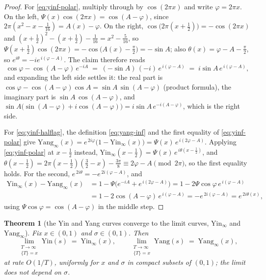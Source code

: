 \documentclass[11pt]{article}
\newtheorem{theorem}{Theorem}[section]
\theoremstyle{definition}
\begin{document}
\begin{proof}
For \eqref{eq:yinf-polar}, multiply through by $\cos(2\pi x)$ and write
$\varphi=2\pi x$. On the left, $\Psi(x)\cos(2\pi x)=\cos(A-\varphi)$,
since $2\pi(x^{2}-x-\tfrac1{16})=A(x)-\varphi$. On the right,
$\cos\bigl(2\pi(x+\tfrac12)\bigr)=-\cos(2\pi x)$ and
$(x+\tfrac12)^{2}-(x+\tfrac12)-\tfrac1{16}=x^{2}-\tfrac5{16}$, so
$\Psi(x+\tfrac12)\cos(2\pi x)=-\cos\bigl(A(x)-\tfrac\pi2\bigr)=-\sin A$;
also $\theta(x)=\varphi-A-\tfrac\pi2$, so
$e^{i\theta}=-ie^{\,i(\varphi-A)}$. The claim therefore reads
\[
\cos\varphi-\cos(A-\varphi)\,e^{-iA}
\;=\;(-\sin A)\,(-i)\,e^{\,i(\varphi-A)}
\;=\;i\sin A\,e^{\,i(\varphi-A)},
\]
and expanding the left side settles it: the real part is
$\cos\varphi-\cos(A-\varphi)\cos A=\sin A\,\sin(A-\varphi)$ (product
formula), the imaginary part is $\sin A\,\cos(A-\varphi)$, and
$\sin A\bigl(\sin(A-\varphi)+i\cos(A-\varphi)\bigr)
=i\sin A\,e^{-i(A-\varphi)}$, which is the right side.

For \eqref{eq:yinf-halflag}, the definition \eqref{eq:yang-inf} and the
first equality of \eqref{eq:yinf-polar} give
$\mathrm{Yang}_{\infty}(x)=e^{\,2i\varphi}\bigl(1-\mathrm{Yin}_{\infty}(x)\bigr)
=\Psi(x)\,e^{\,i(2\varphi-A)}$. Applying \eqref{eq:yinf-polar} at
$x-\tfrac12$ instead,
$\mathrm{Yin}_{\infty}(x-\tfrac12)=\Psi(x)\,e^{\,i\theta(x-\frac12)}$,
and $\theta(x-\tfrac12)=2\pi(x-\tfrac12)(\tfrac32-x)-\tfrac{3\pi}8
\equiv2\varphi-A\pmod{2\pi}$, so the first equality holds. For the
second, $e^{\,2i\theta}=-e^{\,2i(\varphi-A)}$, and
\begin{align*}
\mathrm{Yin}_{\infty}(x)-\mathrm{Yang}_{\infty}(x)
&=1-\Psi\bigl(e^{-iA}+e^{\,i(2\varphi-A)}\bigr)
=1-2\Psi\cos\varphi\,e^{\,i(\varphi-A)}\\
&=1-2\cos(A-\varphi)\,e^{\,i(\varphi-A)}
=-e^{\,2i(\varphi-A)}
=e^{\,2i\theta(x)},
\end{align*}
using $\Psi\cos\varphi=\cos(A-\varphi)$ in the middle step.
\end{proof}

\begin{theorem}[the Yin and Yang curves converge to the limit curves,
$\mathrm{Yin}_{\infty}$ and $\mathrm{Yang}_{\infty}$]
\label{thm:yin-convergence}
Fix $x\in(0,1)$ and $\sigma\in(0,1)$. Then
\[
\lim_{\substack{T\to\infty\\ \{T\}=x}}\mathrm{Yin}(s)
\;=\;\mathrm{Yin}_{\infty}(x),
\qquad
\lim_{\substack{T\to\infty\\ \{T\}=x}}\mathrm{Yang}(s)
\;=\;\mathrm{Yang}_{\infty}(x),
\]
at rate $O(1/T)$, uniformly for $x$ and $\sigma$ in compact subsets of
$(0,1)$; the limit does not depend on $\sigma$.
\end{theorem}
\end{document}
